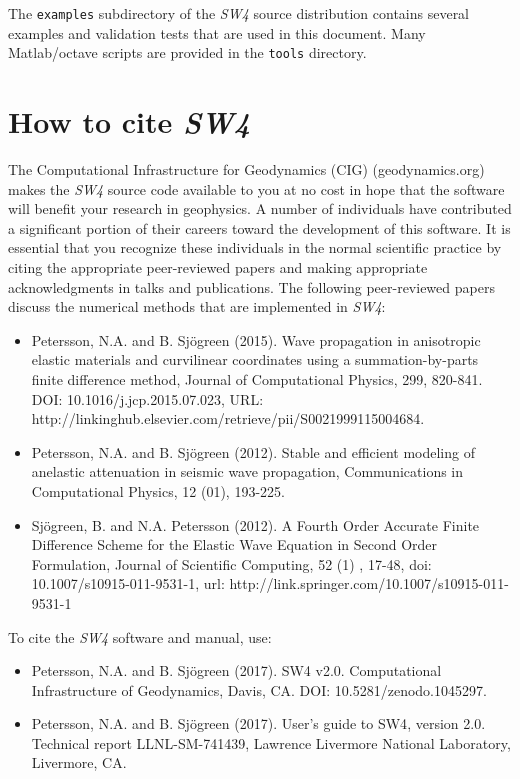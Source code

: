 \documentclass[11pt]{report}
\begin{document}
The {\tt examples} subdirectory of the \emph{SW4} source distribution contains several examples and
validation tests that are used in this document. Many Matlab/octave scripts are provided in the
	{\tt tools} directory.

\section{How to cite \emph{SW4}}

The Computational Infrastructure for Geodynamics (CIG) (geodynamics.org) makes the \emph{SW4}
source code available to you at no cost in hope that the software will benefit your
research in geophysics. A number of individuals have contributed a significant portion of their
careers toward the development of this software. It is essential that you recognize these
individuals in the normal scientific practice by citing the appropriate peer-reviewed papers and
making appropriate acknowledgments in talks and publications. The following peer-reviewed papers
discuss the numerical methods that are implemented in \emph{SW4}:
\begin{itemize}
	\item Petersson, N.A. and B. Sj\"ogreen (2015). Wave propagation in anisotropic elastic materials
	      and curvilinear coordinates using a summation-by-parts finite difference method, Journal of
	      Computational Physics, 299, 820-841. DOI: 10.1016/j.jcp.2015.07.023, URL:
	      http://linkinghub.elsevier.com/retrieve/pii/S0021999115004684.
	\item Petersson, N.A. and B. Sj\"ogreen (2012). Stable and efficient modeling of anelastic
	      attenuation in seismic wave propagation, Communications in Computational Physics, 12 (01),
	      193-225.
	\item Sj\"ogreen, B. and N.A. Petersson (2012). A Fourth Order Accurate Finite Difference Scheme
	      for the Elastic Wave Equation in Second Order Formulation, Journal of Scientific Computing, 52
	      (1) , 17-48, doi: 10.1007/s10915-011-9531-1, url:
	      http://link.springer.com/10.1007/s10915-011-9531-1
\end{itemize}
To cite the \emph{SW4} software and manual, use:
\begin{itemize}
	\item Petersson, N.A. and B. Sj\"ogreen (2017). SW4 v2.0. Computational Infrastructure of
	      Geodynamics, Davis, CA. DOI: 10.5281/zenodo.1045297.
	\item Petersson, N.A. and B. Sj\"ogreen (2017). User's guide to {SW4}, version 2.0. Technical report
	      LLNL-SM-741439, Lawrence Livermore National Laboratory, Livermore, CA.
\end{itemize}
\end{document}
